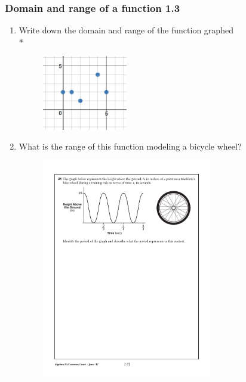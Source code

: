 \documentclass{beamer}
\begin{document}
\frame
{
  \frametitle{Domain and range of a function  \alert{1.3}}
  \begin{enumerate}
    \item Write down the domain and range of the function graphed\\*
    \begin{figure}[!ht]
        \centering
        \includegraphics[width=0.35\textwidth]{discrete-domain-graph.jpeg}
    \end{figure}

    \item What is the range of this function modeling a bicycle wheel?
    \begin{figure}[!ht]
        \centering
        \includegraphics[width=0.70\textwidth]{sine-bike-wheel.pdf}
    \end{figure}
  \end{enumerate}
  }
\end{document}
